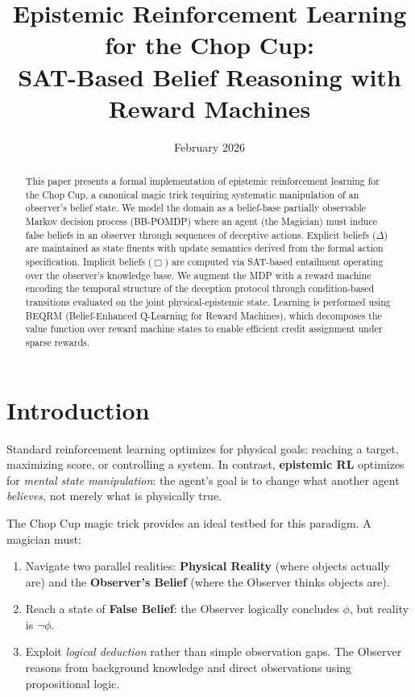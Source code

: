 \documentclass[11pt]{article}
\title{Epistemic Reinforcement Learning for the Chop Cup:\\
\texorpdfstring{SAT-Based Belief Reasoning with Reward Machines}{SAT-Based Belief Reasoning with Reward Machines}}
\author{}
\date{February 2026}
\begin{document}
\maketitle
\begin{abstract}
This paper presents a formal implementation of epistemic reinforcement learning for the Chop Cup, a canonical magic trick requiring systematic manipulation of an observer's belief state. We model the domain as a belief-base partially observable Markov decision process (BB-POMDP) where an agent (the Magician) must induce false beliefs in an observer through sequences of deceptive actions. Explicit beliefs ($\Delta$) are maintained as state fluents with update semantics derived from the formal action specification. Implicit beliefs ($\Box$) are computed via SAT-based entailment operating over the observer's knowledge base. We augment the MDP with a reward machine encoding the temporal structure of the deception protocol through condition-based transitions evaluated on the joint physical-epistemic state. Learning is performed using BEQRM (Belief-Enhanced Q-Learning for Reward Machines), which decomposes the value function over reward machine states to enable efficient credit assignment under sparse rewards. 
\end{abstract}

\section{Introduction}

Standard reinforcement learning optimizes for physical goals: reaching a target, maximizing score, or controlling a system. In contrast, \textbf{epistemic RL} optimizes for \emph{mental state manipulation}: the agent's goal is to change what another agent \emph{believes}, not merely what is physically true.

The Chop Cup magic trick provides an ideal testbed for this paradigm. A magician must:
\begin{enumerate}
    \item Navigate two parallel realities: \textbf{Physical Reality} (where objects actually are) and the \textbf{Observer's Belief} (where the Observer thinks objects are).
    \item Reach a state of \textbf{False Belief}: the Observer logically concludes $\phi$, but reality is $\neg\phi$.
    \item Exploit \emph{logical deduction} rather than simple observation gaps. The Observer reasons from background knowledge and direct observations using propositional logic.
\end{enumerate}
\end{document}
